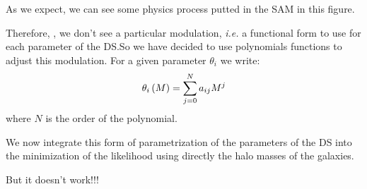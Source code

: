 As we expect, we can see some physics process putted in the SAM in this
figure.

Therefore, , we don't see a
particular modulation, \textit{i.e.} a functional form to use for each
parameter of the DS.\@ So we have decided to use polynomials functions to
adjust this modulation. For a given parameter $\theta_i$ we write:
%
\begin{equation}
    \theta_i\left({M}\right)=\sum_{j=0}^N{a_{ij}{M^j}}
\end{equation}
%
where $N$ is the order of the polynomial.

We now integrate this form of parametrization of the parameters of the DS into
the minimization of the likelihood using directly the halo masses of the
galaxies.

But it doesn't work!!!
%
